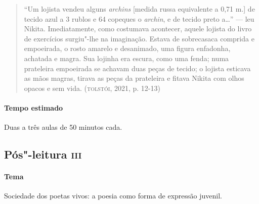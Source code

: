 \documentclass{article}
\begin{document}
\begin{enumerate}
\begin{quote}
``Um lojista vendeu alguns \emph{archins} {[}medida russa equivalente a
0,71 m.{]} de tecido azul a 3 rublos e 64 copeques o \emph{archin}, e de
tecido preto a\ldots{}'' --- leu Nikita. Imediatamente, como costumava
acontecer, aquele lojista do livro de exercícios surgiu"-lhe na
imaginação. Estava de sobrecasaca comprida e empoeirada, o rosto amarelo
e desanimado, uma figura enfadonha, achatada e magra. Sua lojinha era
escura, como uma fenda; numa prateleira empoeirada se achavam duas peças
de tecido; o lojista esticava as mãos magras, tirava as peças da
prateleira e fitava Nikita com olhos opacos e sem vida.
(\textsc{tolstói}, 2021, p. 12-13)
\end{quote}
\end{enumerate}

\paragraph{Tempo estimado} Duas a três aulas de 50 minutos cada.



\subsection{Pós"-leitura \textsc{iii}}

\paragraph{Tema} Sociedade dos poetas vivos: a poesia como forma de expressão
juvenil.

\end{document}
